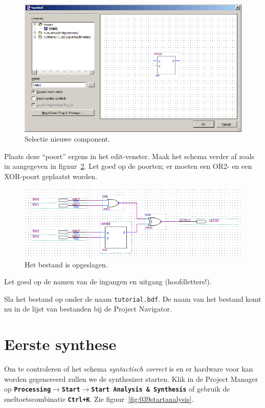 \documentclass[a4paper,12pt,fleqn,twoside]{book}
\def\tutpicscale{0.455}
\newcommand{\menu}[1]{\texttt{\textbf{#1}}}
\newcommand{\naam}[1]{\texttt{#1}}
\def\pijl{$\rightarrow$}%
\begin{document}
\begin{figure}[H]
\centering
\includegraphics[scale=\tutpicscale]{037selectinhibit}
\caption{Selectie nieuwe component.}
\label{fig:037selectinhibit}
\end{figure}

Plaats deze ``poort'' ergens in het edit-venster. Maak het schema verder af
zoals in aangegeven in figuur~\ref{fig:038schematictoplevel}. Let goed op de
poorten; er moeten een OR2- en een XOR-poort geplaatst worden. 
 
\begin{figure}[H]
\centering
\includegraphics[scale=\tutpicscale]{038schematictoplevel}
\caption{Het bestand is opgeslagen.}
\label{fig:038schematictoplevel}
\end{figure}

Let goed op de namen van de ingangen en uitgang (hoofdletters!). 
 
Sla het bestand op onder de naam \naam{tutorial.bdf}. De naam van het bestand
komt nu in de lijst van bestanden bij de Project Navigator.


\section{Eerste synthese}
\label{sec:eerstesynthese}
Om te controleren of het schema \textsl{syntactisch correct} is en er hardware
voor kan worden gegenereerd zullen we de synthesizer starten. Klik in de Project
Manager op \menu{Processing\pijl{}Start\pijl{}Start Analysis \& Synthesis} of
gebruik de sneltoetscombinatie \menu{Ctrl+K}. Zie
figuur~\ref{fig:039startanalysis}.
 
\end{document}
